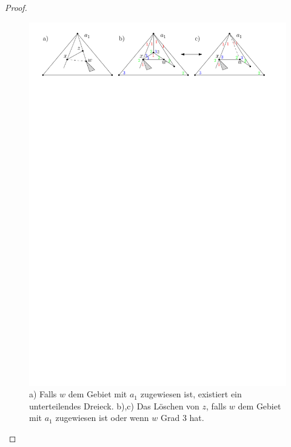 \begin{proof}
\begin{description}[leftmargin =0pt, font = \rmfamily ,listparindent=\parindent,parsep=0pt]
\begin{figure}[b!]
	\centering
	  \includegraphics[width=1\textwidth]{lem5_4.pdf}
\caption{a) Falls $w$ dem Gebiet mit $a_1$ zugewiesen ist, existiert ein unterteilendes Dreieck. b),c) Das Löschen von $z$, falls $w$ dem Gebiet mit $a_1$ zugewiesen ist oder wenn $w$ Grad 3 hat. }
    	\label{pic_lem5_4}
\end{figure}


\end{description}
\end{proof}
